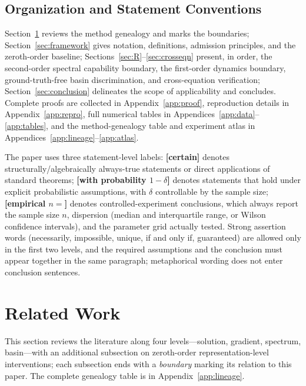 \documentclass[11pt]{article}
\numberwithin{equation}{section}
\begin{document}
\subsection{Organization and Statement Conventions}\label{sec:convention}
Section~\ref{sec:related} reviews the method genealogy and marks the boundaries; Section~\ref{sec:framework} gives notation, definitions, admission principles, and the zeroth-order baseline; Sections~\ref{sec:R}--\ref{sec:crosseqn} present, in order, the second-order spectral capability boundary, the first-order dynamics boundary, ground-truth-free basin discrimination, and cross-equation verification; Section~\ref{sec:conclusion} delineates the scope of applicability and concludes. Complete proofs are collected in Appendix~\ref{app:proof}, reproduction details in Appendix~\ref{app:repro}, full numerical tables in Appendices~\ref{app:data}--\ref{app:tables}, and the method-genealogy table and experiment atlas in Appendices~\ref{app:lineage}--\ref{app:atlas}.

The paper uses three statement-level labels: \textbf{[certain]} denotes structurally/algebraically always-true statements or direct applications of standard theorems; \textbf{[with probability $1-\delta$]} denotes statements that hold under explicit probabilistic assumptions, with $\delta$ controllable by the sample size; \textbf{[empirical $n=$]} denotes controlled-experiment conclusions, which always report the sample size $n$, dispersion (median and interquartile range, or Wilson confidence intervals), and the parameter grid actually tested. Strong assertion words (necessarily, impossible, unique, if and only if, guaranteed) are allowed only in the first two levels, and the required assumptions and the conclusion must appear together in the same paragraph; metaphorical wording does not enter conclusion sentences.

\FloatBarrier

\section{Related Work}\label{sec:related}
This section reviews the literature along four levels---solution, gradient, spectrum, basin---with an additional subsection on zeroth-order representation-level interventions; each subsection ends with a \emph{boundary} marking its relation to this paper. The complete genealogy table is in Appendix~\ref{app:lineage}.
\end{document}
